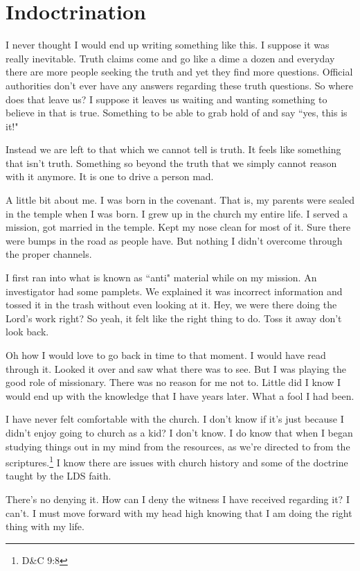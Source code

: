 \chapter{Indoctrination}

I never thought I would end up writing something like this. I suppose it was
really inevitable. Truth claims come and go like a dime a dozen and everyday
there are more people seeking the truth and yet they find more questions.
Official authorities don't ever have any answers regarding these truth
questions. So where does that leave us? I suppose it leaves us waiting and
wanting something to believe in that is true. Something to be able to grab hold
of and say ``yes, this is it!"

Instead we are left to that which we cannot tell is truth. It feels like
something that isn't truth. Something so beyond the truth that we simply cannot
reason with it anymore. It is one to drive a person mad.

A little bit about me. I was born in the covenant. That is, my parents were
sealed in the temple when I was born. I grew up in the church  my entire life. I
served a mission, got married in the temple. Kept my nose clean for most of it.
Sure there were bumps in the road as people have. But nothing I didn't overcome
through the proper channels.

I first ran into what is known as ``anti" material while on my mission. An
investigator had some pamplets. We explained it was incorrect information and
tossed it in the trash without even looking at it. Hey, we were there doing the
Lord's work right? So yeah, it felt like the right thing to do. Toss it away
don't look back.

Oh how I would love to go back in time to that moment. I would have read through
it. Looked it over and saw what there was to see. But I was playing the good
role of missionary. There was no reason for me not to. Little did I know I would
end up with the knowledge that I have years later. What a fool I had been.

I have never felt comfortable with the church. I don't know if it's just because
I didn't enjoy going to church as a kid? I don't know. I do know that when I
began studying things out in my mind from the resources, as we're directed to
from the scriptures.\footnote{D\&C 9:8} I know there are issues with church 
history and some of the doctrine taught by the LDS faith.

There's no denying it. How can I deny the witness I have received regarding it?
I can't. I must move forward with my head high knowing that I am doing the right
thing with my life.

